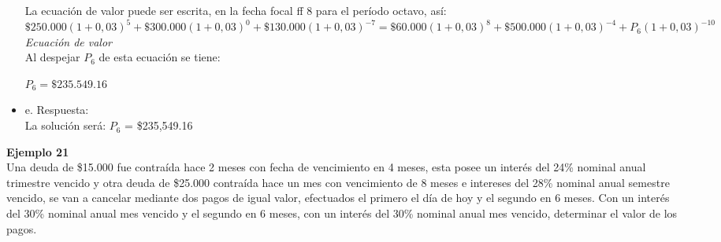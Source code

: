 \begin{itemize}
	La ecuación de valor puede ser escrita, en la fecha focal ff 8 para el período octavo, así:\\
	
	$\$250.000(1+0,03)^5 + \$300.000(1+0,03)^0 + \$130.000(1+0,03)^{-7} = \$60.000(1+0,03)^8 + \$500.000(1+0,03)^{-4} + P_{6}(1+0,03)^{-10}$\hspace{33 pt} \textit{Ecuación de valor}\\
	
	Al despejar 	$P_{6}$ de esta ecuación se tiene:
	
	$P_{6} = \$235.549.16$\\
	
	\item e. Respuesta:\\
	
	La solución será: $P_{6}$ = \$235,549.16\\
	
	
\end{itemize}

\textbf{Ejemplo 21}\\

Una deuda de \$15.000 fue contraída hace 2 meses con fecha de vencimiento en 4 meses, esta posee un interés del 24\% nominal anual trimestre vencido y otra deuda de \$25.000 contraída hace un mes con vencimiento de 8 meses e intereses del 28\% nominal anual semestre vencido, se van a cancelar mediante dos pagos de igual valor, efectuados el primero el día de hoy y el segundo en 6 meses. Con un interés del 30\% nominal anual mes vencido y el segundo en 6 meses, con un interés del 30\% nominal anual mes vencido, determinar el valor de los pagos.\\

